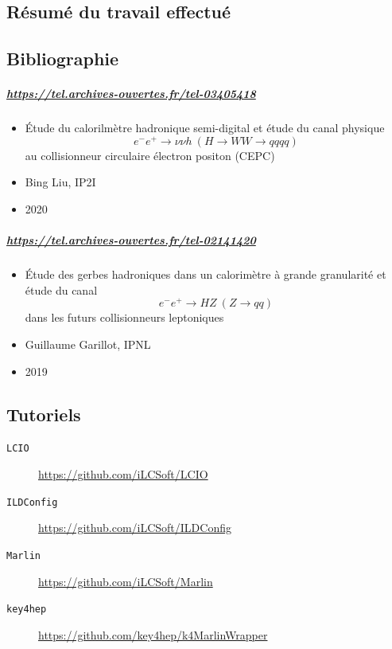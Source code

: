 \documentclass[10pt,a4paper]{report}
\newcommand{\electron}{e^{+}}
\newcommand{\positron}{e^{-}}
\newcommand{\nnh}{\nu \nu h}
\begin{document}
\begin{appendix}


\chapter{Résumé du travail effectué}

\section{Bibliographie}

\paragraph{\url{https://tel.archives-ouvertes.fr/tel-03405418}}
\begin{itemize}
	\item Étude du calorilmètre hadronique semi-digital et étude du canal physique 
	$$ \positron \electron \longrightarrow \nnh \ (H \longrightarrow WW \longrightarrow qqqq)$$ 
	au collisionneur circulaire électron positon (CEPC) 
	\item Bing Liu, IP2I
	\item 2020
\end{itemize}

\paragraph{\url{https://tel.archives-ouvertes.fr/tel-02141420}}
\begin{itemize}
	\item Étude des gerbes hadroniques dans un calorimètre à grande granularité et étude du canal $$ \positron \electron \longrightarrow HZ \ (Z \longrightarrow qq) $$ dans les futurs collisionneurs leptoniques
	\item Guillaume Garillot, IPNL
	\item 2019
\end{itemize}

\section{Tutoriels}

\begin{description}
	\item[\texttt{LCIO}] \url{https://github.com/iLCSoft/LCIO}
	\item[\texttt{ILDConfig}] \url{https://github.com/iLCSoft/ILDConfig}
	\item[\texttt{Marlin}] \url{https://github.com/iLCSoft/Marlin}
	\item[\texttt{key4hep}] \url{https://github.com/key4hep/k4MarlinWrapper}
\end{description}


\end{appendix}
\end{document}
